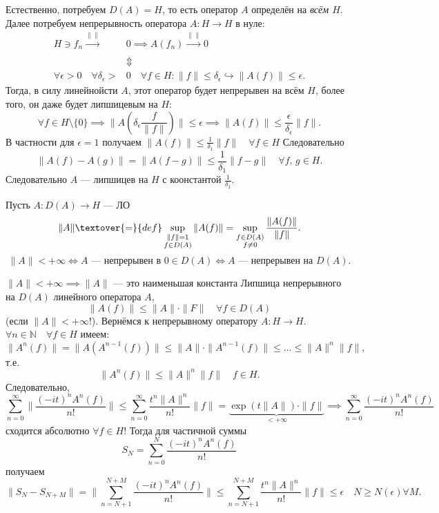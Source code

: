 Естественно, потребуем $D(A) =H$, то есть оператор $A$ определён
на \emph{всём $H$}. Далее потребуем непрерывность оператора
$A: H\to H$ в нуле:
\begin{align*}
	H \ni f_n \xrightarrow[]{\| \|} &0 \implies A(f_n)
	\xrightarrow[]{\| \|}0\\
					&\Updownarrow\\
	\forall \epsilon > 0 \quad \forall \delta_\epsilon >&0
\quad \forall f \in H: \| f\|\le \delta_\epsilon \hookrightarrow
\| A(f)\|\le \epsilon
.\end{align*}
Тогда, в силу линейнойсти $A$, этот оператор будет непрерывен
 на всём $H$, более того, он даже будет
липшицевым на $H$:
\[
	\forall f \in  H \setminus \{0\} \implies \| A\left( 
	\delta_\epsilon \frac{f}{\| f\|}\right) \|\le \epsilon
	\implies \| A(f)\|\le  \frac{\epsilon}{\delta_\epsilon}
	\| f\|
.\] 
В частности для $\epsilon=1$ получаем $\| A(f)\|\le \frac{1}{\delta_{1}}\| f\|\quad \forall f \in H$
Следовательно
\[
	\| A(f)-A(g)\|=\| A(f-g)\|\le \frac{1}{\delta_1}\| f-g\|
	\quad \forall f,\,g \in H
.\] 
Следовательно $A$ --- липшицев на $H$ с коонстантой $\frac{1}{\delta_1}$.
\begin{dfn}
	Пусть $A: D(A) \to  H$ --- ЛО
	\[
	\| A\|\textover{=}{def} \sup_{\substack{\| f\|=1\\
	f \in  D(A)}}\| A(f)\|=
	\sup_{\substack{f \in D(A)\\ f \neq 0}}\frac{\| A(f)\|}{
	\| f\|}
	.\] 
	\[
\| A\|<+\infty \Leftrightarrow A \text{ --- непрерывен в }
0 \in  D(A) \Leftrightarrow A \text{ --- непрерывен на } D(A)
	.\] 
\end{dfn}
$\| A\|<+\infty \implies \| A\|$ --- это наименьшая
константа Липшица непрерывного на $D(A)$ линейного оператора $A$,
\[
	\| A(f)\|\le \| A\|\cdot \| F\| \quad \forall f \in 
	D(A)
\]
(если $\| A\|<+\infty$!).
Вернёмся к непрерывному оператору $A: H \to H$. $\forall n \in 
 \mathbb{N} \quad \forall f \in  H$ имеем:
 \[
	 \| A^n(f)\|=\| A(A^{n-1}(f))\|\le 
	 \| A\|\cdot \| A^{n-1}(f)\|\le \ldots
	 \le \| A\|^{n} \| f\|,
 \] 
 т.\:е.
 \[
	 \| A^{n}(f)\|\le  \| A\|^n \| f\| \quad f \in H
 .\] 
 Следовательно,
 \[
	 \sum_{n=0}^{\infty} \| \frac{(-it)^nA^n(f)}{n!}\|\le 
	 \sum_{n=0}^{\infty} \frac{t^n \| A\|^n}{n!}\| f\|=
	 \underbrace{\exp\left( t \| A\| \right) \cdot \| f\|}_{<+\infty}\implies \sum_{n=0}^{\infty} \frac{(-it)^nA^n(f)}{n!}
 \] 
 сходится абсолютно $\forall f \in  H$!
 Тогда для частичной суммы
 \[
	 S_N = \sum_{n=0}^{N} \frac{(-it)^n A^n(f)}{n!}
 \]
 получаем
 \[
	 \| S_N-S_{N+M}\|= \| \sum_{n=N+1}^{N+M} \frac{(-it)^n
	 A^n(f)}{n!}\|\le \sum_{n=N+1}^{N+M} \frac{t^n \| A\|^n}{n!}
	 \| f\| \le \epsilon \quad N \ge N(\epsilon) \forall M
 .\] 
